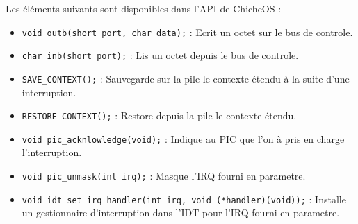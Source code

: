 Les \'el\'ements suivants sont disponibles dans l'API de ChicheOS :

\begin{itemize}
  \item \verb+void outb(short port, char data);+ : Ecrit un octet sur le bus de controle.
  \item \verb+char inb(short port);+ : Lis un octet depuis le bus de controle.
  \item \verb+SAVE_CONTEXT();+ : Sauvegarde sur la pile le contexte \'etendu \`a la suite d'une interruption.
  \item \verb+RESTORE_CONTEXT();+ : Restore depuis la pile le contexte \'etendu.
  \item \verb+void pic_acknlowledge(void);+ : Indique au PIC que l'on \`a pris en charge l'interruption.
  \item \verb+void pic_unmask(int irq);+ : Masque l'IRQ fourni en parametre.
  \item \verb+void idt_set_irq_handler(int irq, void (*handler)(void));+ : Installe un gestionnaire d'interruption dans l'IDT pour l'IRQ fourni en parametre.
\end{itemize}

